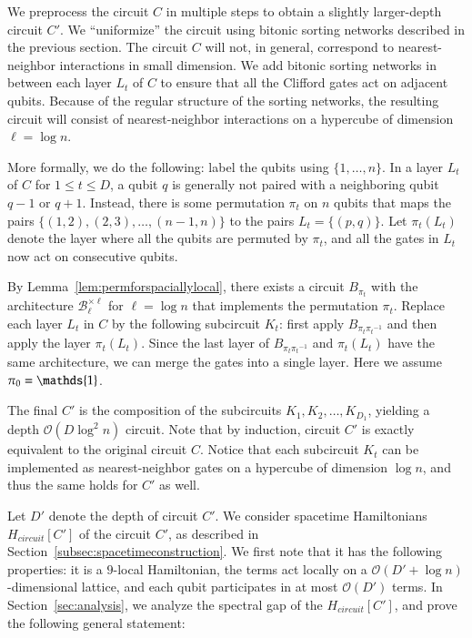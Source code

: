 \documentclass[11pt,letterpaper]{article}
\theoremstyle{definition}
\theoremstyle{remark}
\newcommand{\cB}{\mathcal B}
\renewcommand{\leq}{\leqslant}
\numberwithin{equation}{section}
\theoremstyle{definition}
\newcommand{\Id}{\mathop{\mathds{1}}\!\mathinner{}}
\begin{document}
%

We preprocess the circuit $C$ in multiple steps to obtain a slightly larger-depth circuit $C'$. We ``uniformize'' the circuit using bitonic sorting networks described in the previous section. The circuit $C$ will not, in general, correspond to nearest-neighbor interactions in small dimension. We add bitonic sorting networks in between each layer $L_t$ of $C$ to ensure that all the Clifford gates act on adjacent qubits. Because of the regular structure of the sorting networks, the resulting circuit will consist of nearest-neighbor interactions on a hypercube of dimension $\ell = \log n$. 

More formally, we do the following: label the qubits using $\{1,\ldots,n\}$. In a layer $L_t$ of $C$ for $1 \leq t \leq D$, a qubit $q$ is generally not paired with a neighboring qubit $q - 1$ or $q + 1$. Instead, there is some permutation $\pi_t$ on $n$ qubits that maps the pairs $\{ (1,2), (2,3), \ldots, (n-1,n) \}$ to the pairs $L_t = \{ (p,q) \}$. Let $\pi_t(L_t)$ denote the layer where all the qubits are permuted by $\pi_t$, and all the gates in $L_t$ now act on consecutive qubits. 

By Lemma~\ref{lem:permforspaciallylocal}, there exists a circuit $B_{\pi_t}$ with the architecture  $\cB_\ell^{\times \ell}$ for $\ell = \log n$ that implements the permutation $\pi_t$. Replace each layer $L_t$ in $C$ by the following subcircuit $K_t$: first apply $B_{\pi_t {\pi_t}^{-1}}$ and then apply the layer $\pi_t(L_t)$. Since the last layer of $B_{\pi_t {\pi_t}^{-1}}$ and $\pi_t(L_t)$ have the same architecture, we can merge the gates into a single layer. Here we assume $\pi_0 = \Id$.%

The final $C'$ is the composition of the subcircuits $K_1,K_2,\ldots,K_{D_1}$, yielding a depth $\mathcal{O}(D \log^2 n)$ circuit. Note that by induction, circuit $C'$ is exactly equivalent to the original circuit $C$. Notice that each subcircuit $K_t$ can be implemented as nearest-neighbor gates on a hypercube of dimension $\log n$, and thus the same holds for $C'$ as well.

Let $D'$ denote the depth of circuit $C'$. We consider spacetime Hamiltonians $H_{circuit}[C']$ of the circuit $C'$, as described in Section~\ref{subsec:spacetimeconstruction}. We first note that it has the following properties: it is a $9$-local Hamiltonian, the terms act locally on a $\mathcal{O}(D' + \log n)$-dimensional lattice, and each qubit participates in at most $\mathcal{O}(D')$ terms. 
\iffalse
In Section~\ref{sec:analysis}, we analyze the spectral gap of the $H_{circuit}[C']$, and prove the following general statement:
\end{document}

